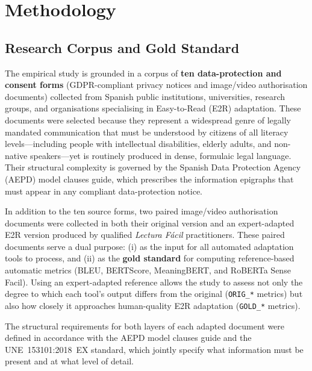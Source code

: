 \documentclass[12pt, a4paper]{article}
\begin{document}
\section{Methodology}
\label{sec:methodology}

\subsection{Research Corpus and Gold Standard}
\label{ssec:corpus}

The empirical study is grounded in a corpus of \textbf{ten data-protection and consent
forms} (GDPR-compliant privacy notices and image/video authorisation documents) collected
from Spanish public institutions, universities, research groups, and organisations
specialising in Easy-to-Read (E2R) adaptation. These documents were selected because they
represent a widespread genre of legally mandated communication that must be understood by
citizens of all literacy levels---including people with intellectual disabilities, elderly
adults, and non-native speakers---yet is routinely produced in dense, formulaic legal
language. Their structural complexity is governed by the Spanish Data Protection Agency
(AEPD) model clauses guide, which prescribes the information epigraphs that must appear in
any compliant data-protection notice.

In addition to the ten source forms, two paired image/video authorisation documents were
collected in both their original version and an expert-adapted E2R version produced by
qualified \textit{Lectura Fácil} practitioners. These paired documents serve a dual
purpose: (i) as the input for all automated adaptation tools to process, and (ii) as the
\textbf{gold standard} for computing reference-based automatic metrics (BLEU, BERTScore,
MeaningBERT, and RoBERTa Sense Facil). Using an expert-adapted reference allows the study
to assess not only the degree to which each tool's output differs from the original
(\texttt{ORIG\_*} metrics) but also how closely it approaches human-quality E2R adaptation
(\texttt{GOLD\_*} metrics).

The structural requirements for both layers of each adapted document were defined in
accordance with the AEPD model clauses guide and the UNE~153101:2018~EX standard, which
jointly specify what information must be present and at what level of detail.
\end{document}
